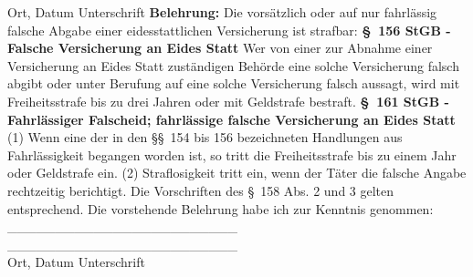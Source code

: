 \small{Ort, Datum}\hspace{4.8cm}
\small{Unterschrift}
\newline
\textbf{Belehrung:}\newline
Die vorsätzlich oder auf nur fahrlässig falsche Abgabe einer eidesstattlichen Versicherung ist strafbar:\newline
\newline
\textbf{\S\ 156 StGB - Falsche Versicherung an Eides Statt}\newline
Wer von einer zur Abnahme einer Versicherung an Eides Statt zuständigen Behörde eine solche Versicherung falsch abgibt oder unter Berufung auf eine solche Versicherung falsch aussagt, wird mit Freiheitsstrafe bis zu drei Jahren oder mit Geldstrafe bestraft.\newline
\textbf{\S\ 161 StGB - Fahrlässiger Falscheid; fahrlässige falsche Versicherung an Eides Statt}
(1) Wenn eine der in den \S\S\ 154 bis 156 bezeichneten Handlungen aus Fahrlässigkeit begangen worden ist, so tritt die Freiheitsstrafe bis zu einem Jahr oder Geldstrafe ein.
(2) Straflosigkeit tritt ein, wenn der Täter die falsche Angabe rechtzeitig berichtigt. Die Vorschriften des \S\ 158 Abs. 2 und 3 gelten entsprechend.\newline
\newline
Die vorstehende Belehrung habe ich zur Kenntnis genommen:\newline
\newline
\_\_\_\_\_\_\_\_\_\_\_\_\_\_\_\_\_\_\_\_\_\_\_\_ \hspace{1.5cm} \_\_\_\_\_\_\_\_\_\_\_\_\_\_\_\_\_\_\_\_\_\_\_\_ \\
\small{Ort, Datum}\hspace{4.8cm}
\small{Unterschrift}
